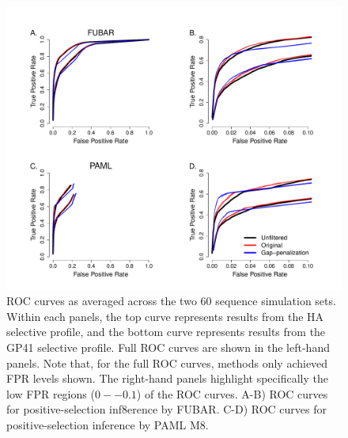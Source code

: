 \documentclass[11pt]{article}
\begin{document}
\begin{figure}[H]
\centerline{\includegraphics[width=6in]{Figures/ROC_prk.pdf}}
\caption{\label{roc} ROC curves as averaged across the two 60 sequence simulation sets. Within each panels, the top curve represents results from the HA selective profile, and the bottom curve represents results from the GP41 selective profile. Full ROC curves are shown in the left-hand panels. Note that, for the full ROC curves, methods only achieved FPR levels shown. The right-hand panels highlight specifically the low FPR regions ($0--0.1$) of the ROC curves. A-B) ROC curves for positive-selection inf8erence by FUBAR. C-D) ROC curves for positive-selection inference by PAML M8.}
\end{figure}
\end{document}
